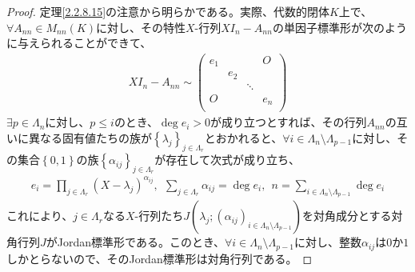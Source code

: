 \documentclass[dvipdfmx]{jsarticle}
\begin{document}
\begin{proof}
定理\ref{2.2.8.15}の注意から明らかである。実際、代数的閉体$K$上で、$\forall A_{nn} \in M_{nn}(K)$に対し、その特性$X$-行列$XI_{n} - A_{nn}$の単因子標準形が次のように与えられることができて、
\begin{align*}
XI_{n} - A_{nn} \sim \begin{pmatrix}
e_{1} & \  & \  & O \\
\  & e_{2} & \  & \  \\
\  & \  & \ddots & \  \\
O & \  & \  & e_{n} \\
\end{pmatrix}
\end{align*}
$\exists p \in \varLambda_{n}$に対し、$p \leq i$のとき、$\deg e_{i} > 0$が成り立つとすれば、その行列$A_{nn}$の互いに異なる固有値たちの族が$\left\{ \lambda_{j} \right\}_{j \in \varLambda_{r}}$とおかれると、$\forall i \in \varLambda_{n} \setminus \varLambda_{p - 1}$に対し、その集合$\left\{ 0,1 \right\}$の族$\left\{ \alpha_{ij} \right\}_{j \in \varLambda_{r}}$が存在して次式が成り立ち、
\begin{align*}
e_{i} = \prod_{j \in \varLambda_{r}} \left( X - \lambda_{j} \right)^{\alpha_{ij}},\ \ \sum_{j \in \varLambda_{r}} \alpha_{ij} = \deg e_{i},\ \ n = \sum_{i \in \varLambda_{n} \setminus \varLambda_{p - 1}} {\deg e_{i}}
\end{align*}
これにより、$j \in \varLambda_{r}$なる$X$-行列たち$J\left( \lambda_{j};\left( \alpha_{ij} \right)_{i \in \varLambda_{n} \setminus \varLambda_{p - 1}} \right)$を対角成分とする対角行列$J$がJordan標準形である。このとき、$\forall i \in \varLambda_{n} \setminus \varLambda_{p - 1}$に対し、整数$\alpha_{ij}$は$0$か$1$しかとらないので、そのJordan標準形は対角行列である。
\end{proof}
\end{document}

